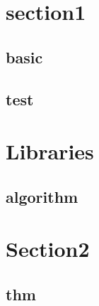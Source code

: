 \section{section1}
    \subsection{basic}
        
    \subsection{test}
        

\section{Libraries}
    \subsection{algorithm}
        

\section{Section2}
    \subsection{thm}
        